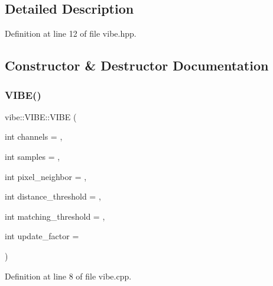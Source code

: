 \subsection{Detailed Description}


Definition at line 12 of file vibe.\+hpp.



\subsection{Constructor \& Destructor Documentation}
\mbox{\label{classvibe_1_1_v_i_b_e_a57bebe0c56531dbd274e9d8e2a07fca5}} 
\subsubsection{\texorpdfstring{V\+I\+B\+E()}{VIBE()}}
{\footnotesize\ttfamily vibe\+::\+V\+I\+B\+E\+::\+V\+I\+BE (\begin{DoxyParamCaption}\item[{int}]{channels = {},  }\item[{int}]{samples = {},  }\item[{int}]{pixel\+\_\+neighbor = {},  }\item[{int}]{distance\+\_\+threshold = {},  }\item[{int}]{matching\+\_\+threshold = {},  }\item[{int}]{update\+\_\+factor = {} }\end{DoxyParamCaption})}



Definition at line 8 of file vibe.\+cpp.


